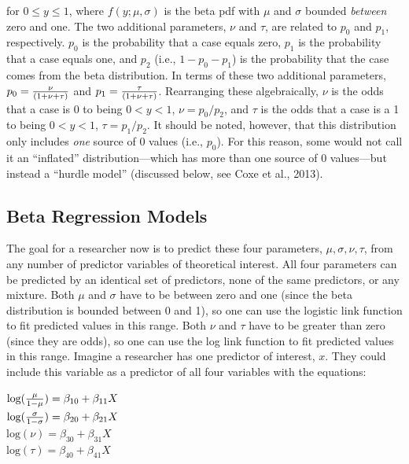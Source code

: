 \documentclass[english,man]{apa6}
\theoremstyle{definition}
\theoremstyle{definition}
\theoremstyle{remark}
\begin{document}
for \(0 \leq y \leq 1\), where \(f(y;\mu,\sigma)\) is the beta pdf with
\(\mu\) and \(\sigma\) bounded \emph{between} zero and one. The two
additional parameters, \(\nu\) and \(\tau\), are related to \(p_0\) and
\(p_1\), respectively. \(p_0\) is the probability that a case equals
zero, \(p_1\) is the probability that a case equals one, and \(p_2\)
(i.e., \(1 - p_0 - p_1\)) is the probability that the case comes from
the beta distribution. In terms of these two additional parameters,
\(p_0 = {\nu \over (1 + \nu + \tau)}\) and
\(p_1 = {\tau \over (1 + \nu + \tau)}\). Rearranging these
algebraically, \(\nu\) is the odds that a case is 0 to being
\(0 < y < 1\), \(\nu = p_0 / p_2\), and \(\tau\) is the odds that a case
is a 1 to being \(0 < y < 1\), \(\tau = p_1 / p_2\). It should be noted,
however, that this distribution only includes \emph{one} source of 0
values (i.e., \(p_0\)). For this reason, some would not call it an
\enquote{inflated} distribution---which has more than one source of 0
values---but instead a \enquote{hurdle model} (discussed below, see Coxe
et al., 2013).

\subsection{Beta Regression Models}\label{beta-regression-models}

The goal for a researcher now is to predict these four parameters,
\(\mu, \sigma, \nu, \tau\), from any number of predictor variables of
theoretical interest. All four parameters can be predicted by an
identical set of predictors, none of the same predictors, or any
mixture. Both \(\mu\) and \(\sigma\) have to be between zero and one
(since the beta distribution is bounded between 0 and 1), so one can use
the logistic link function to fit predicted values in this range. Both
\(\nu\) and \(\tau\) have to be greater than zero (since they are odds),
so one can use the log link function to fit predicted values in this
range. Imagine a researcher has one predictor of interest, \(x\). They
could include this variable as a predictor of all four variables with
the equations:

\begin{center}
$\text{log}({\mu \over 1 - \mu}) = \beta_{10} + \beta_{11}X$\\
$\text{log}({\sigma \over 1 - \sigma}) = \beta_{20} + \beta_{21}X$\\
$\text{log}(\nu) = \beta_{30} + \beta_{31}X$\\
$\text{log}(\tau) = \beta_{40} + \beta_{41}X$
\end{center}
\end{document}
